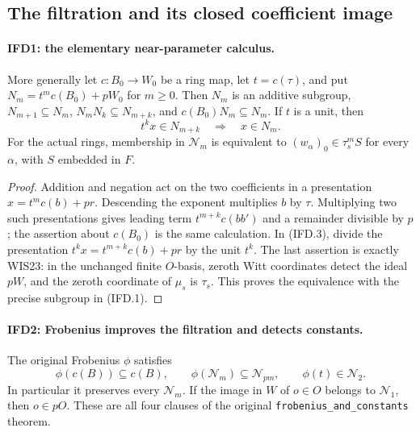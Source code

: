 \subsection{The filtration and its closed coefficient image}

\paragraph{IFD1: the elementary near-parameter calculus.}
\label{claim:IFD1}
More generally let $c:B_0\to W_0$ be a ring map, let
$t=c(\tau)$, and put $N_m=t^mc(B_0)+pW_0$ for $m\geq0$.
Then $N_m$ is an additive subgroup, $N_{m+1}\subseteq N_m$,
$N_mN_k\subseteq N_{m+k}$, and $c(B_0)N_m\subseteq N_m$.
If $t$ is a unit, then
\[
             t^k x\in N_{m+k}\quad\Longrightarrow\quad x\in N_m.
                                                               \tag{IFD.3}
\]
For the actual rings, membership in $\mathcal N_m$ is equivalent to
$(w_\alpha)_0\in\tau_s^m S$ for every $\alpha$, with $S$ embedded in $F$.

\begin{proof}
Addition and negation act on the two coefficients in a presentation
$x=t^mc(b)+pr$. Descending the exponent multiplies $b$ by $\tau$.
Multiplying two such presentations gives leading term
$t^{m+k}c(bb')$ and a remainder divisible by $p$; the assertion about
$c(B_0)$ is the same calculation. In (IFD.3), divide the presentation
$t^kx=t^{m+k}c(b)+pr$ by the unit $t^k$.
The last assertion is exactly WIS23: in the unchanged finite $O$-basis,
zeroth Witt coordinates detect the ideal $pW$, and the zeroth coordinate
of $\mu_s$ is $\tau_s$. This proves the equivalence with the precise
subgroup in (IFD.1).
\end{proof}

\paragraph{IFD2: Frobenius improves the filtration and detects constants.}
\label{claim:IFD2}
The original Frobenius $\phi$ satisfies
\[
 \phi(c(B))\subseteq c(B),\qquad
 \phi(\mathcal N_m)\subseteq\mathcal N_{pm},\qquad
 \phi(t)\in\mathcal N_2.                                      \tag{IFD.4}
\]
In particular it preserves every $\mathcal N_m$. If the image in $W$
of $o\in O$ belongs to $\mathcal N_1$, then $o\in pO$.
These are all four clauses of the original
\texttt{frobenius\_and\_constants} theorem.

